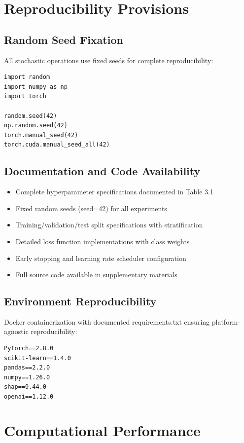 \section{Reproducibility Provisions}

\subsection{Random Seed Fixation}

All stochastic operations use fixed seeds for complete reproducibility:

\begin{verbatim}
import random
import numpy as np
import torch

random.seed(42)
np.random.seed(42)
torch.manual_seed(42)
torch.cuda.manual_seed_all(42)
\end{verbatim}

\subsection{Documentation and Code Availability}

\begin{itemize}
\item Complete hyperparameter specifications documented in Table 3.1
\item Fixed random seeds (seed=42) for all experiments
\item Training/validation/test split specifications with stratification
\item Detailed loss function implementations with class weights
\item Early stopping and learning rate scheduler configuration
\item Full source code available in supplementary materials
\end{itemize}

\subsection{Environment Reproducibility}

Docker containerization with documented requirements.txt ensuring platform-agnostic reproducibility:

\begin{verbatim}
PyTorch==2.8.0
scikit-learn==1.4.0
pandas==2.2.0
numpy==1.26.0
shap==0.44.0
openai==1.12.0
\end{verbatim}

\section{Computational Performance}

